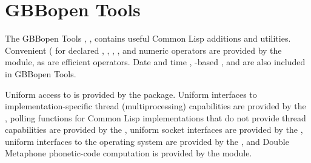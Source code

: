 \documentclass[10pt,twoside,english,pdftex]{article}
\begin{document}
\section{GBBopen Tools}

%
%
%
The GBBopen Tools , , contains
useful Common Lisp additions and utilities.  Convenient ( for declared ,
, ,
, and  numeric operators are
provided by the  module, as are efficient
 operators.  Date and time
,
-based , and  are also included in GBBopen Tools.

Uniform access to  is
provided by the  package.  Uniform interfaces to
implementation-specific thread (multiprocessing) capabilities are provided by
the ,
polling functions for Common Lisp implementations that do not provide thread
capabilities are provided by the , uniform socket interfaces are provided by the , uniform interfaces to the operating system are provided by the , and Double Metaphone phonetic-code computation is provided by the  module.
\end{document}
